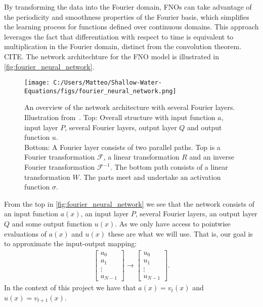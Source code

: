 By transforming the data into the Fourier domain, FNOs can take advantage of the periodicity and smoothness properties of the Fourier basis, which simplifies the learning process for functions defined over continuous domains.
This approach leverages the fact that differentiation with respect to time is equivalent to multiplication in the Fourier domain, distinct from the convolution theorem. CITE.
The network architechture for the FNO model is illustrated in \autoref{fig:fourier_neural_network}.
\begin{figure}[H]
    \centering
    \texttt{[image: C:/Users/Matteo/Shallow-Water-Equations/figs/fourier\_neural\_network.png]}
    \caption{An overview of the network architecture with several Fourier layers. Illustration from~\cite{FNO_2021}.
            Top: Overall structure with input function $a$, input layer $P$, several Fourier layers, output layer $Q$ and output function $u$.\\
            Bottom: A Fourier layer consists of two parallel paths. Top is a Fourier transformation $\mathcal{F}$, a linear transformation $R$ and an inverse Fourier transformation $\mathcal{F}^{-1}$.
            The bottom path consists of a linear transformation $W$. The parts meet and undertake an activation function $\sigma$.}\label{fig:fourier_neural_network}
\end{figure}
From the top in \autoref{fig:fourier_neural_network} we see that the network consists of an input function $a(x)$, an input layer $P$, several Fourier layers, an output layer $Q$ and some output function $u(x)$.
As we only have access to pointwise evaluations of $a(x)$ and $u(x)$ these are what we will use. 
That is, our goal is to approximate the input-output mapping: 
\begin{align*}
    \begin{bmatrix}
        a_0 \\
        a_1 \\
        \vdots \\
        a_{N-1}
    \end{bmatrix}
    \to
    \begin{bmatrix}
        u_0 \\
        u_1 \\
        \vdots \\
        u_{N-1}
    \end{bmatrix}.
\end{align*}
In the context of this project we have that $a(x) = v_t(x)$ and $u(x) = v_{t+1}(x)$.

